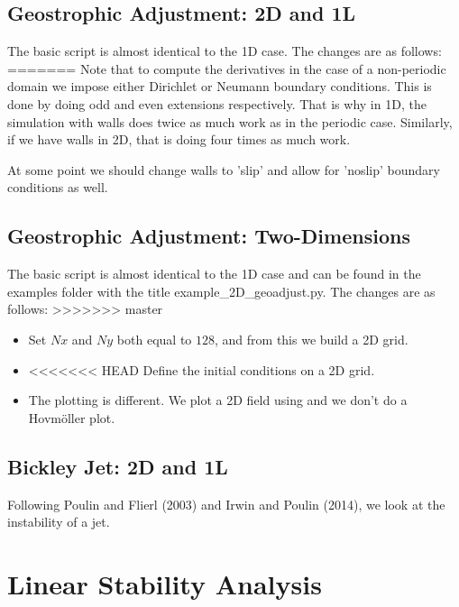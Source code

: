 \documentclass[letterpaper,10pt,english]{sphinxmanual}
\begin{document}
\section{Geostrophic Adjustment: 2D and 1L}
\label{examples:geostrophic-adjustment-2d-and-1l}
The basic script is almost identical to the 1D case. The changes are as
follows:
=======
Note that to compute the derivatives in the case of a non-periodic
domain we impose either Dirichlet or Neumann boundary conditions. This
is done by doing odd and even extensions respectively. That is why in
1D, the simulation with walls does twice as much work as in the periodic
case. Similarly, if we have walls in 2D, that is doing four times as
much work.

At some point we should change walls to ’slip’ and allow for ’noslip’
boundary conditions as well.


\section{Geostrophic Adjustment: Two-Dimensions}
\label{examples:geostrophic-adjustment-two-dimensions}
The basic script is almost identical to the 1D case and can be found in
the examples folder with the title example\_2D\_geoadjust.py. The
changes are as follows:
>>>>>>> master
\begin{itemize}
\item {} 
Set \(Nx\) and \(Ny\) both equal to \(128\), and from
this we build a 2D grid.

\item {} 
<<<<<<< HEAD
Define the initial conditions on a 2D grid.

\item {} 
The plotting is different. We plot a 2D field using and we don’t do a
Hovmöller plot.

\end{itemize}


\section{Bickley Jet: 2D and 1L}
\label{examples:bickley-jet-2d-and-1l}
Following Poulin and Flierl (2003) and Irwin and Poulin (2014), we look
at the instability of a jet.


\chapter{Linear Stability Analysis}
\label{linear_stability::doc}\label{linear_stability:linear-stability-analysis}
\end{document}
